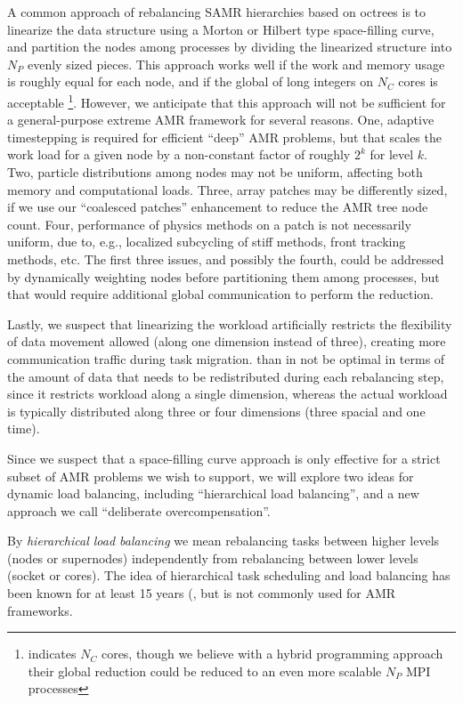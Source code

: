 \documentclass[14pt,letter]{article}
\begin{document}
A common approach of rebalancing SAMR hierarchies based on octrees is
to linearize the data structure using a Morton or Hilbert type
space-filling curve, and partition the nodes among processes by
dividing the linearized structure into $N_P$ evenly sized pieces.
This approach works well if the work and memory usage is roughly equal
for each node, and if the global  of long
integers on $N_C$ cores is acceptable \footnote{\cite{BuGh07}
  indicates $N_C$ cores, though we believe with a hybrid programming
  approach their global reduction could be reduced to an even more
  scalable $N_P$ MPI processes}.  However, we anticipate that this
approach will not be sufficient for a general-purpose extreme AMR
framework for several reasons.
%
One, adaptive timestepping is required for efficient ``deep'' AMR
problems, but that scales the work load for a given node by a
non-constant factor of roughly $2^k$ for level $k$.
%
Two, particle distributions among nodes may not be uniform, affecting both memory and computational loads.
%
Three, array patches may be differently sized, if we use our ``coalesced patches'' enhancement to reduce the AMR tree node count.  
%
Four, performance of physics methods on a patch is not necessarily
uniform, due to, e.g., localized subcycling of stiff methods, front
tracking methods, etc.  The first three issues, and possibly the
fourth, could be addressed by dynamically weighting nodes before
partitioning them among processes, but that would require additional
global communication to perform the reduction.
%

Lastly, we suspect that linearizing the workload artificially
restricts the flexibility of data movement allowed (along one
dimension instead of three), creating more communication traffic
during task migration.  than in not be optimal in terms of the amount
of data that needs to be redistributed during each rebalancing step,
since it restricts workload along a single dimension, whereas the
actual workload is typically distributed along three or four
dimensions (three spacial and one time).

Since we suspect that a space-filling curve approach is only effective
for a strict subset of AMR problems we wish to support, we will
explore two ideas for dynamic load balancing, including ``hierarchical
load balancing'', and a new approach we call ``deliberate
overcompensation''.

 By \textit{hierarchical load
  balancing} we mean rebalancing tasks between higher levels (nodes or
supernodes) independently from rebalancing between lower levels
(socket or cores).  The idea of hierarchical task scheduling and load
balancing has been known for at least 15 years (\cite{AhGh94}, but is
not commonly used for AMR frameworks.
\end{document}
